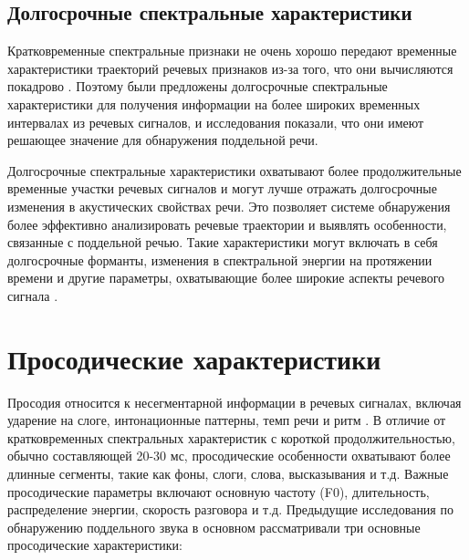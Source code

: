 
\subsection{Долгосрочные спектральные характеристики}

Кратковременные спектральные признаки не очень хорошо передают временные характеристики траекторий речевых признаков из-за того, что они вычисляются покадрово \cite{wu2013synthetic}. Поэтому были предложены долгосрочные спектральные характеристики для получения информации на более широких временных интервалах из речевых сигналов, и исследования показали, что они имеют решающее значение для обнаружения поддельной речи.

Долгосрочные спектральные характеристики охватывают более продолжительные временные участки речевых сигналов и могут лучше отражать долгосрочные изменения в акустических свойствах речи. Это позволяет системе обнаружения более эффективно анализировать речевые траектории и выявлять особенности, связанные с поддельной речью. Такие характеристики могут включать в себя долгосрочные форманты, изменения в спектральной энергии на протяжении времени и другие параметры, охватывающие более широкие аспекты речевого сигнала \cite{das2019long}.

\section{Просодические характеристики}

Просодия относится к несегментарной информации в речевых сигналах, включая ударение на слоге, интонационные паттерны, темп речи и ритм \cite{kinnunen2010overview}. В отличие от кратковременных спектральных характеристик с короткой продолжительностью, обычно составляющей 20-30 мс, просодические особенности охватывают более длинные сегменты, такие как фоны, слоги, слова, высказывания и т.д. Важные просодические параметры включают основную частоту (F0), длительность, распределение энергии, скорость разговора и т.д. Предыдущие исследования \cite{kinnunen2010overview} по обнаружению поддельного звука в основном рассматривали три основные просодические характеристики:


